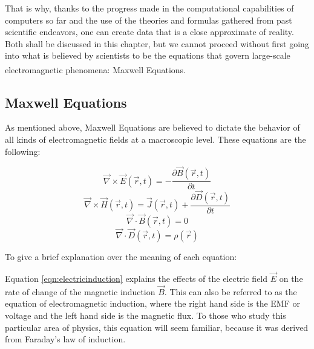 That is why, thanks to the progress made in the computational capabilities of computers so far and the use of the theories and formulas gathered from past scientific endeavors, one can create data that is a close approximate of reality. Both shall be discussed in this chapter, but we cannot proceed without first going into what is believed by scientists to be the equations that govern large-scale electromagnetic phenomena\textsuperscript{\cite{stratton2007electromagnetic}}: Maxwell Equations.

\subsection{Maxwell Equations}

As mentioned above, Maxwell Equations are believed to dictate the behavior of all kinds of electromagnetic fields at a macroscopic level. These equations are the following:

\begin{equation}
	\label{eqn:electricinduction}
	\vec{\nabla} \times \vec{E}(\vec{r},t) = - \frac{\partial \vec{B}(\vec{r},t)}{\partial t}
\end{equation}
\begin{equation}
	\label{eqn:amperesLaw}
	\vec{\nabla} \times \vec{H}(\vec{r},t) = \vec{J}(\vec{r},t) + \frac{\partial \vec{D}(\vec{r},t)}{\partial t}
\end{equation}
\begin{equation}
	\label{eqn:magneticDivergence}
	\vec{\nabla} \cdot \vec{B}(\vec{r},t) = 0
\end{equation}
\begin{equation}
	\label{eqn:gausslaw}
	\vec{\nabla} \cdot \vec{D}(\vec{r},t) = \rho (\vec{r})
\end{equation}

To give a brief explanation over the meaning of each equation:

Equation \ref{eqn:electricinduction} explains the effects of the electric field $\vec{E}$ on the rate of change of the magnetic induction $\vec{B}$. This can also be referred to as the equation of electromagnetic induction, where the right hand side is the EMF or voltage and the left hand side is the magnetic flux. To those who study this particular area of physics, this equation will seem familiar, because it was derived from Faraday's law of induction.

